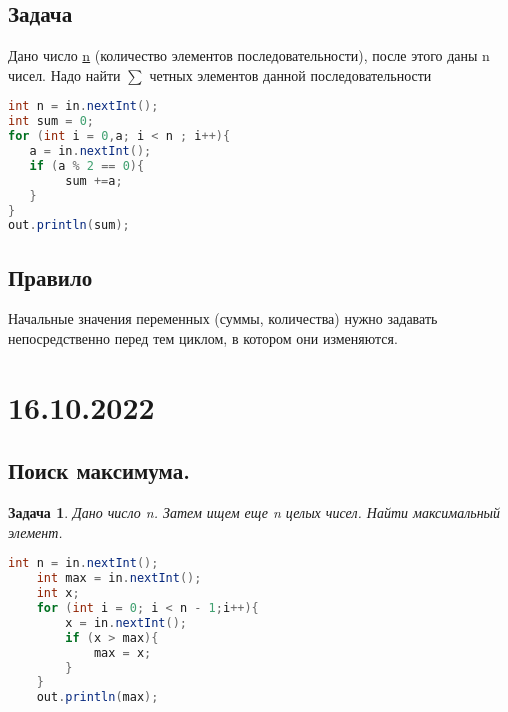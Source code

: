 \documentclass{article}
\newtheorem{task}{Задача}
\begin{document}
\subsection{Задача}
Дано число \underline{n} (количество элементов последовательности), после этого даны n чисел.
Надо найти $\sum$ четных элементов данной последовательности
\begin{lstlisting}[language=Java] 
int n = in.nextInt(); 
int sum = 0;
for (int i = 0,a; i < n ; i++){
   a = in.nextInt();
   if (a % 2 == 0){
        sum +=a;
   }
}
out.println(sum);
\end{lstlisting} 
\subsection{Правило}
Начальные значения переменных (суммы, количества) нужно задавать
непосредственно перед тем циклом, в котором они изменяются.
\section{16.10.2022}
\subsection{Поиск максимума.}
\begin{task}
    Дано число n. Затем ищем еще n целых чисел. Найти максимальный элемент.
\end{task}
    \begin{lstlisting}[language=Java] 
    int n = in.nextInt();
    int max = in.nextInt();
    int x;
    for (int i = 0; i < n - 1;i++){
        x = in.nextInt();
        if (x > max){
            max = x;
        }
    }
    out.println(max);
    \end{lstlisting} 
\end{document}
